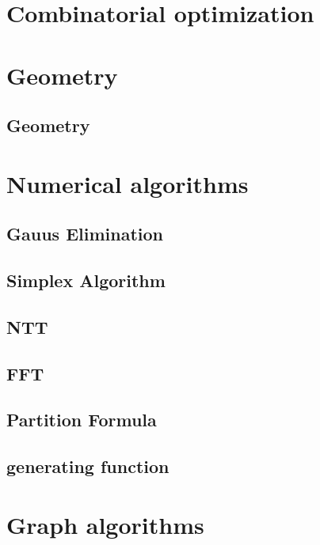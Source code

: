 \section{Combinatorial optimization}

\section{Geometry}
\subsection{Geometry}
\raggedbottom
\hrulefill

\section{Numerical algorithms}
\subsection{Gauus Elimination}
\raggedbottom
\hrulefill
\subsection{Simplex Algorithm}
\raggedbottom
\hrulefill
\subsection{NTT}
\raggedbottom
\hrulefill
\subsection{FFT}
\raggedbottom
\hrulefill
\subsection{Partition Formula}
\raggedbottom
\hrulefill
\subsection{generating function}
\raggedbottom
\hrulefill

\section{Graph algorithms}
